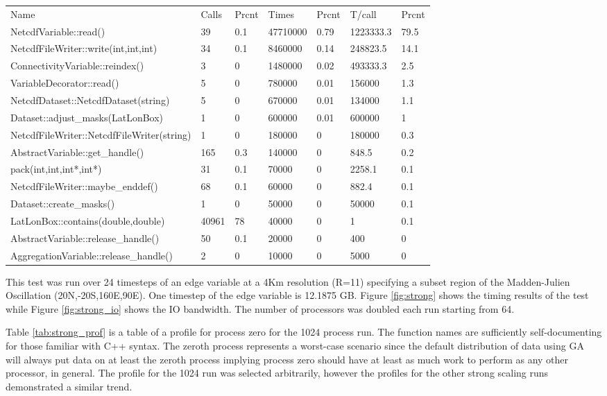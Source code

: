 \begin{table*}[!t]
\center
\caption{Strong Scaling Profile for Process 0}
\label{tab:strong_prof}
\begin{tabular}{lllllll}
Name&Calls&Prcnt&Times&Prcnt&T/call&Prcnt\\
NetcdfVariable::read()&39&0.1&47710000&0.79&1223333.3&79.5\\
NetcdfFileWriter::write(int,int,int)&34&0.1&8460000&0.14&248823.5&14.1\\
ConnectivityVariable::reindex()&3&0&1480000&0.02&493333.3&2.5\\
VariableDecorator::read()&5&0&780000&0.01&156000&1.3\\
NetcdfDataset::NetcdfDataset(string)&5&0&670000&0.01&134000&1.1\\
Dataset::adjust\_masks(LatLonBox)&1&0&600000&0.01&600000&1\\
NetcdfFileWriter::NetcdfFileWriter(string)&1&0&180000&0&180000&0.3\\
AbstractVariable::get\_handle()&165&0.3&140000&0&848.5&0.2\\
pack(int,int,int*,int*)&31&0.1&70000&0&2258.1&0.1\\
NetcdfFileWriter::maybe\_enddef()&68&0.1&60000&0&882.4&0.1\\
Dataset::create\_masks()&1&0&50000&0&50000&0.1\\
LatLonBox::contains(double,double)&40961&78&40000&0&1&0.1\\
AbstractVariable::release\_handle()&50&0.1&20000&0&400&0\\
AggregationVariable::release\_handle()&2&0&10000&0&5000&0\\
\end{tabular}
\end{table*}

This test was run over 24 timesteps of an edge variable at a 4Km resolution
(R=11) specifying a subset region of the Madden-Julien Oscillation\cite{MJO}
(20N,-20S,160E,90E).  One timestep of the edge variable is 12.1875 GB.  Figure
\ref{fig:strong} shows the timing results of the test while Figure
\ref{fig:strong_io} shows the IO bandwidth.  The number of processors was
doubled each run starting from 64.

Table \ref{tab:strong_prof} is a table of a profile for process zero for the
1024 process run.  The function names are sufficiently self-documenting for
those familiar with C++ syntax.  The zeroth process represents a worst-case
scenario since the default distribution of data using GA will always put data
on at least the zeroth process implying process zero should have at least as
much work to perform as any other processor, in general.  The profile for the
1024 run was selected arbitrarily, however the profiles for the other strong
scaling runs demonstrated a similar trend.

